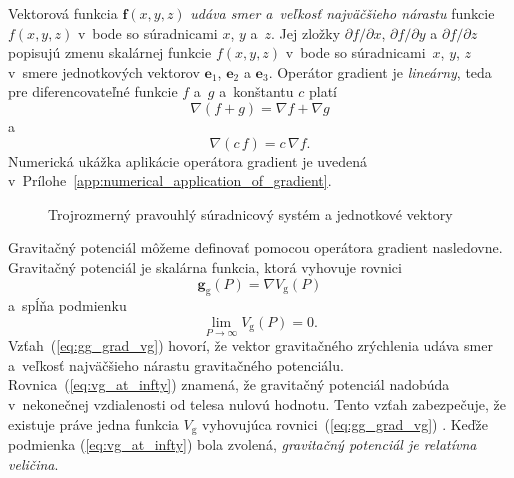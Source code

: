 \documentclass[a4paper,12pt]{book}
\newcommand{\gidx}{\mathrm g}
\let\vec\mathbf
\begin{document}
%
Vektorová funkcia $\vec f(x, y, z)$ \emph{udáva smer a~veľkosť najväčšieho
nárastu} funkcie $f(x, y, z)$ v~bode so súradnicami $x$, $y$ a~$z$.  Jej zložky 
$\partial f \slash \partial x$, $\partial f \slash \partial y$ a $\partial 
f \slash \partial z$ popisujú zmenu skalárnej funkcie $f(x, y, z)$ v~bode so 
súradnicami~$x$, $y$, $z$ v~smere jednotkových vektorov $\vec e_1$, $\vec e_2$ 
a $\vec e_3$.  Operátor gradient  je \emph{lineárny}, teda pre diferencovateľné 
funkcie $f$ a~$g$ a~konštantu $c$ platí
%
\begin{equation}
\label{eq:gradient_additivity}
\nabla \left(f + g \right) = \nabla f + \nabla g
\end{equation}
%
a
%
\begin{equation}
\label{eq:gradient_homogenity}
\nabla (c \, f) = c \, \nabla f{.}
\end{equation}
%
Numerická ukážka aplikácie operátora gradient je uvedená 
v~Prílohe~\ref{app:numerical_application_of_gradient}.

\begin{figure}
\centering

\caption{Trojrozmerný pravouhlý súradnicový systém a jednotkové vektory}
\label{fig:3d_coord_system}
\end{figure}

Gravitačný potenciál môžeme definovať pomocou operátora gradient nasledovne.  
Gravitačný potenciál je skalárna funkcia, ktorá vyhovuje rovnici 
\parencite{SansoGeoidDetermination}
%
\begin{equation}
\label{eq:gg_grad_vg}
\vec g_\gidx(P) = \nabla V_\gidx(P)
\end{equation}
%
a~spĺňa podmienku
%
\begin{equation}
\label{eq:vg_at_infty}
\lim_{P \to \infty} V_\gidx(P) = 0{.}
\end{equation}
%
Vzťah~(\ref{eq:gg_grad_vg}) hovorí, že vektor gravitačného zrýchlenia udáva 
smer a~veľkosť najväčšieho nárastu gravitačného potenciálu.  
Rovnica~(\ref{eq:vg_at_infty}) znamená, že gravitačný potenciál nadobúda 
v~nekonečnej vzdialenosti od telesa nulovú hodnotu.  Tento vzťah zabezpečuje, 
že existuje práve jedna funkcia $V_\gidx$ vyhovujúca 
rovnici~(\ref{eq:gg_grad_vg}) \parencite{SansoGeoidDetermination}.  Keďže 
podmienka (\ref{eq:vg_at_infty}) bola zvolená, \emph{gravitačný potenciál je 
relatívna veličina}.
\end{document}

